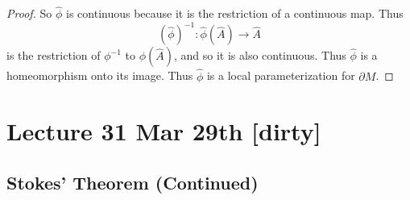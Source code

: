\documentclass[notoc,notitlepage]{tufte-book}
\begin{document}
\begin{proof}
  So $\hat{\phi}$ is continuous because it is the restriction of a continuous
  map. Thus
  \begin{equation*}
    (\hat{\phi})^{-1} : \hat{\phi}(\hat{A}) \to \hat{A}
  \end{equation*}
  is the restriction of $\phi^{-1}$ to $\phi(\hat{A})$, and so it is also
  continuous. Thus $\hat{\phi}$ is a homeomorphism onto its image. Thus
  $\hat{\phi}$ is a local parameterization for $\partial M$.
\end{proof}



\chapter{Lecture 31 Mar 29th [dirty]}%
\label{chp:lecture_31_mar_29th}

\section{Stokes' Theorem (Continued)}%
\label{sec:stokes_theorem_continued}
\end{document}
